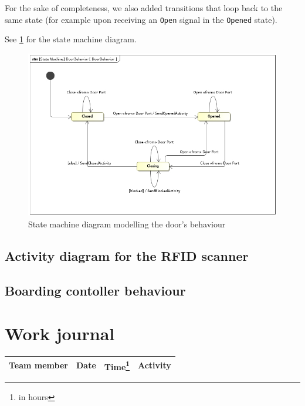 \documentclass[a4paper]{article}
\begin{document}
For the sake of completeness, we also added transitions that loop back to the
same state (for example upon receiving an \texttt{Open} signal in the
\texttt{Opened} state).

See \cref{fig:stm-door} for the state machine diagram.

\begin{figure}[p]
	\includegraphics[width=\textwidth]{stm-DoorBehavior.jpg}
	\caption{State machine diagram modelling the door's behaviour}%
	\label{fig:stm-door}
\end{figure}


\subsection{Activity diagram for the RFID scanner}



\subsection{Boarding contoller behaviour}




\section{Work journal}

\begin{tabularx}{\textwidth}{l l l X}
	\toprule
	Team member & Date & Time\footnote{in hours} & Activity \\ \midrule

	\bottomrule
\end{tabularx}

\clearpage
\glsaddall
\printglossaries
\end{document}
